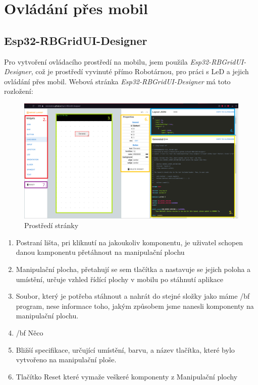 \chapter{Ovládání přes mobil}


\section{Esp32-RBGridUI-Designer} %
Pro vytvoření ovládacího prostředí na mobilu, jsem použila {\em Esp32-RBGridUI-Designer}, %
což je prostředí vyvinuté přímo Robotárnou, pro práci s LeD a jejich ovládání přes mobil. Webová stránka {\em Esp32-RBGridUI-Designer} má toto rozložení: 

\begin{figure}[htbp]
	\centering
	\includegraphics[width=1\textwidth]{img/Esp32-RBGridUI-Designer - malování.png}
	\caption{Prostředí stránky}
\end{figure}

\begin{enumerate}
	\item Postraní lišta, pri kliknutí na jakoukoliv komponentu, je uživatel schopen danou kamponentu přetáhnout na manipulační plochu
	\item Manipulační plocha, přetahují se sem tlačítka a nastavuje se jejich poloha a umístění, určuje vzhled řídící plochy v mobilu po stáhnutí aplikace
	\item Soubor, který je potřeba stáhnout a nahrát do stejné složky jako máme {/bf program}, nese informace toho, jakým způsobem jsme nanesli komponenty na manipulační plochu.
	\item {/bf Něco} %
	\item Bližší specifikace, určující umístění, barvu, a název tlačítka, které bylo vytvořeno na manipulační ploše. 
	\item Tlačítko Reset které vymaže veškeré komponenty z Manipulační plochy
\end{enumerate}


